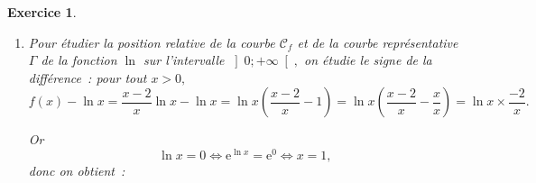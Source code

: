 \documentclass[10pt]{article}
\newtheorem{exo}{Exercice}
\begin{document}
\begin{exo}
\begin{enumerate}
\begin{enumerate}
\begin{alignat*}{3}
&u(x)=1-2\times\frac{1}{x},&& \hspace{1cm}&&v(x)=\ln x, \\
& u'(x)=-2\times\left(-\frac{1}{x^2}\right)=\frac{2}{x^2},&& &&v'(x)=\frac{1}{x}.\\
\end{alignat*}

On obtient, pour tout $x\in \left]0;+\infty\right[~:$

\begin{align*}
f'(x)&=\frac{2}{x^2}\times \ln x+\left(1-\frac{2}{x}\right)\times\frac{1}{x}\\
&=\frac{2\ln x}{x^2}+\frac{1\textcolor{red}{\times x}}{x\textcolor{red}{\times x}}-\frac{2}{x}\times \frac{1}{x}\\
&=\frac{2\ln x}{x^2}+ \frac{x}{x^2}-\frac{2}{x^2}\\
&=\frac{2\ln x+x-2}{x^2}\\
&=\frac{g(x)}{x^2}.
\end{align*}

\item Comme $f'(x)=\frac{g(x)}{x^2}$ pour tout $x>0$ et que $x^2>0,$ $f'$ et $g$ sont du même signe.

\medskip

On a étudié le signe de $g$ dans la question 1.(d)~; on en déduit le signe de $f'$ et les variations de $f~:$

\medskip
\begin{center}
\end{center}

\end{enumerate}
\item Pour étudier la position relative de la courbe $\mathcal{C}_f$ et de la courbe représentative $\Gamma$ de la fonction $\ln$ sur l'intervalle $\left]0;+\infty\right[,$ on étudie le signe de la différence~: pour tout $x>0,$
\[f(x)-\ln x=\frac{x-2}{x}\ln x-\ln x=\ln x\left(\frac{x-2}{x}-1\right)=
\ln x\left(\frac{x-2}{x}-\frac{x}{x}\right)=\ln x\times \frac{-2}{x}.\]

Or 
\[\ln x=0\iff\text{e}^{\ln x}=\text{e}^0\iff x=1,\] donc on obtient~:


\end{enumerate}
\end{exo}
\end{document}
